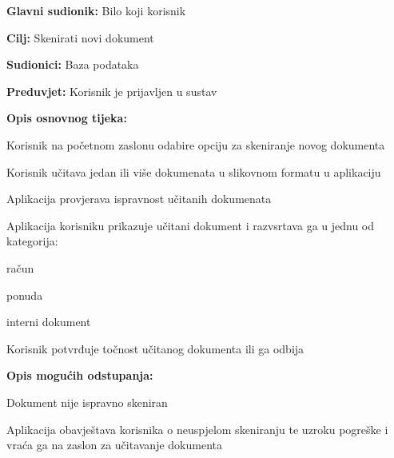 					\noindent {}
					\begin{packed_item}
	
						\item \textbf{Glavni sudionik:} Bilo koji korisnik
						\item  \textbf{Cilj:} Skenirati novi dokument
						\item  \textbf{Sudionici:} Baza podataka
						\item  \textbf{Preduvjet:} Korisnik je prijavljen u sustav
						\item  \textbf{Opis osnovnog tijeka:}
						
						\item[] \begin{packed_enum}
	
							\item Korisnik na početnom zaslonu odabire opciju za skeniranje novog dokumenta
							\item Korisnik učitava jedan ili više dokumenata u slikovnom formatu u aplikaciju
							\item Aplikacija provjerava ispravnost učitanih dokumenata
							\item Aplikacija korisniku prikazuje učitani dokument i razvsrtava ga u jednu od kategorija:

								\begin{packed_enum}
									
									\item račun
									\item ponuda
									\item interni dokument

								\end{packed_enum}

							\item Korisnik potvrđuje točnost učitanog dokumenta ili ga odbija

						\end{packed_enum}

						\item  \textbf{Opis mogućih odstupanja:}
						
						\item[] \begin{packed_item}
	
							\item[3.a] Dokument nije ispravno skeniran
							\item[] \begin{packed_enum}
								
								\item Aplikacija obavještava korisnika o neuspjelom skeniranju te uzroku pogreške i vraća ga na zaslon za učitavanje dokumenta
								
							\end{packed_enum}
							
						\end{packed_item}

					\end{packed_item}



